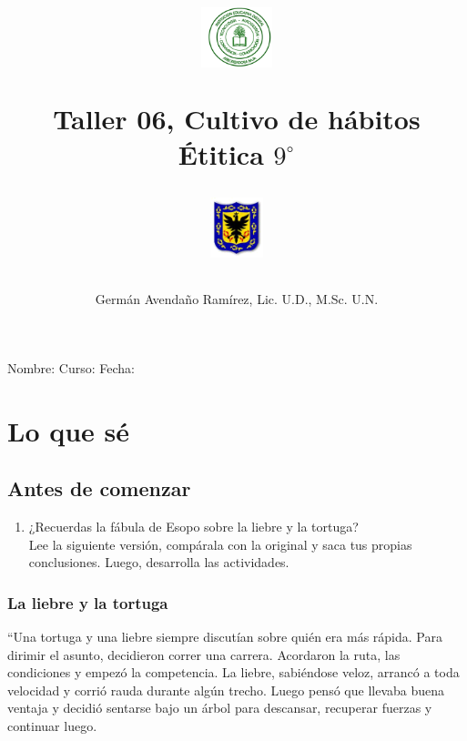 \documentclass[10pt,twoside]{article}
\author{Germ\'an Avenda\~no Ram\'irez, Lic. U.D., M.Sc. U.N.}
\title{\begin{minipage}{.2\textwidth}
\includegraphics[height=1.75cm]{Images/logo-colegio.png}\end{minipage}
\begin{minipage}{.55\textwidth}
\begin{center}
Taller 06, Cultivo de hábitos  \\
Étitica $9^{\circ}$
\end{center}
\end{minipage}\hfill
\begin{minipage}{.2\textwidth}
\includegraphics[height=1.75cm]{Images/logo-sed.png} 
\end{minipage}}
\date{}
\begin{document}
\maketitle
Nombre: \hrulefill Curso: \underline{\hspace*{44pt}} Fecha: \underline{\hspace*{2.5cm}}
\section*{Lo que s\'{e}}
\subsection*{Antes de comenzar}
\begin{enumerate}
\item ¿Recuerdas la fábula de Esopo sobre la liebre y la tortuga?\\
Lee la siguiente versión, compárala con la original y saca tus propias conclusiones. Luego, desarrolla las actividades.
\end{enumerate}
\subsubsection*{La liebre y la tortuga}
“Una tortuga y una liebre siempre discutían sobre quién
era más rápida. Para dirimir el asunto, decidieron correr
una carrera. Acordaron la ruta, las condiciones y empezó
la competencia. La liebre, sabiéndose veloz, arrancó a toda
velocidad y corrió rauda durante algún trecho. Luego pensó
que llevaba buena ventaja y decidió sentarse bajo un árbol
para descansar, recuperar fuerzas y continuar luego.
\end{document}
